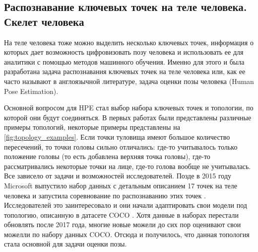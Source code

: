 \subsection{Распознавание ключевых точек на теле человека. Скелет человека}

На теле человека тоже можно выделить несколько ключевых точек, информация о которых дает возможность цифровизовать позу человека и использовать ее для аналитики с помощью методов машинного обучения. Именно для этого и была разработана задача распознавания ключевых точек на теле человека  или, как ее часто называют в англоязычной литературе, задача оценки позы человека (Human Pose Estimation).

Основной вопросом для HPE стал выбор набора ключевых точек и топологии, по которой они будут соединяться. В первых работах были представлены различные примеры топологий, некоторые примеры представлены на \autoref{fig:topology_examples}. Если точки туловища имеют большое количество пересечений, то точки головы сильно отличались: где-то учитывалось только положение головы (то есть добавлена верхняя точка головы), где-то рассматривались некоторые точки на лице, где-то голова вообще не учитывалась. Все зависело от задачи и возможностей исследователей. Позде в 2015 году Microsoft выпустило набор данных с детальным описанием 17 точек на теле человека и запустила соревнование по распознаванию этих точек \cite{COCO_dataset, COCO_topology}. Исследователей это заинтересовало и они начали адаптировать свои модели под топологию, описанную в датасете COCO \cite{COCO_dataset}. Хотя данные в наборах перестали обновлять после 2017 года, многие новые можели до сих пор оценивают свои можелли по набору данных COCO. Отсюда и получилось, что данная топология стала основной для задачи оценки позы.

